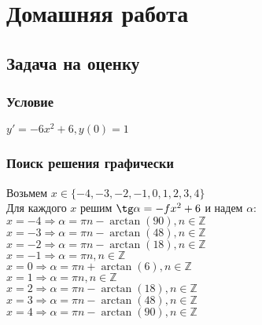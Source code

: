 \section{Домашняя работа}

\subsection{Задача на оценку}
\subsubsection{Условие}
$y' = -6x^2 + 6, y(0) = 1$

\subsubsection{Поиск решения графически}
Возьмем $x \in \{-4, -3, -2, -1, 0, 1, 2, 3, 4\}$ \\
Для каждого $x$ решим $\tg \alpha = -fx^2 + 6$ и надем $\alpha$: \\
$x = -4 \Rightarrow \alpha = \pi n - \arctan(90), n \in \mathbb{Z}$ \\
$x = -3 \Rightarrow \alpha = \pi n - \arctan(48), n \in \mathbb{Z}$ \\
$x = -2 \Rightarrow \alpha = \pi n - \arctan(18), n \in \mathbb{Z}$ \\
$x = -1 \Rightarrow \alpha = \pi n , n \in \mathbb{Z}$ \\
$x = 0 \Rightarrow \alpha = \pi n + \arctan(6), n \in \mathbb{Z}$ \\
$x = 1 \Rightarrow \alpha = \pi n , n \in \mathbb{Z}$ \\
$x = 2 \Rightarrow \alpha = \pi n - \arctan(18), n \in \mathbb{Z}$ \\
$x = 3 \Rightarrow \alpha = \pi n - \arctan(48), n \in \mathbb{Z}$ \\
$x = 4 \Rightarrow \alpha = \pi n - \arctan(90), n \in \mathbb{Z}$ \\

